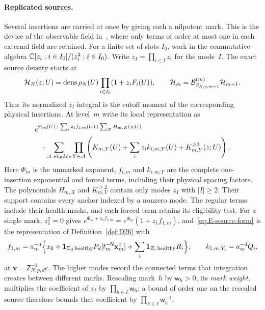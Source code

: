\paragraph{Replicated sources.}
Several insertions are carried at once by giving each a nilpotent mark. This is the device of the observable field in~\cite[Section~2.3]{BauerschmidtBrydgesSlade2015}, where only terms of order at most one in each external field are retained. For a finite set of slots $I_0$, work in the commutative algebra $\mathbb{C}[z_i:i\in I_0]/(z_i^2:i\in I_0)$. Write $z_I=\prod_{i\in I}z_i$ for the mode~$I$. The exact source density starts at
\begin{equation}\label{eq:E-multiple-density}
 \mathcal H_N(z;U)=\operatorname{dens}\rho_N(U)\prod_{i\in I_0}(1+z_iF_i(U)),
 \qquad \mathcal H_m=\mathcal{B}^{(m)}_{\beta_{N,p,m+1}}\mathcal H_{m+1}.
\end{equation}
Thus its normalized $z_I$ integral is the cutoff moment of the corresponding physical insertions. At level~$m$ write its local representation as
\begin{equation}\label{eq:E-source-form}
\begin{aligned}
 &e^{\Phi_m(U)+\sum_i z_if_{i,m}(U)+\sum_X H_{m,X}(z;U)}
 \\
 &\quad\cdot\sum_{\mathcal A\ {\rm eligible}}
 \prod_{Y\in\mathcal A}
 \left(K_{m,Y}(U)+\sum_i z_i k_{i,m,Y}(U)+K^{\ge2}_{m,Y}(z;U)\right).
\end{aligned}
\end{equation}
Here $\Phi_m$ is the unmarked exponent, $f_{i,m}$ and $k_{i,m,Y}$ are the complete one-insertion exponential and forced terms, including their physical spacing factors. The polynomials $H_{m,X}$ and $K^{\ge2}_{m,Y}$ contain only modes $z_I$ with $|I|\ge2$. Their support contains every anchor indexed by a nonzero mode. The regular terms include their health masks, and each forced term retains its eligibility test. For a single mark, $z_1^2=0$ gives $e^{\Phi_m+z_1f_{1,m}}=e^{\Phi_m}(1+z_1f_{1,m})$, and~\eqref{eq:E-source-form} is the representation of Definition~\ref{def:D26} with
\begin{equation*}
 f_{1,m}=a_m^{-d}\Bigl\{x_0+\mathbf1_{\Sigma_d\,\mathrm{healthy}}P_d[t_m^{-\mathsf{N}}\mathbf x_m^\circ]+\sum_i\mathbf1_{Z_i\,\mathrm{healthy}}R_i\Bigr\},
 \qquad k_{1,m,Y_i}=a_m^{-d}Q_i,
\end{equation*}
at $\mathbf v=\mathsf Z^{-1}_{N,p,d}c$. The higher modes record the connected terms that integration creates between different marks. Rescaling mark~$h$ by $\mathsf w_h>0$, its \emph{mark weight}, multiplies the coefficient of $z_I$ by $\prod_{h\in I}\mathsf w_h$; a bound of order one on the rescaled source therefore bounds that coefficient by $\prod_{h\in I}\mathsf w_h^{-1}$.


